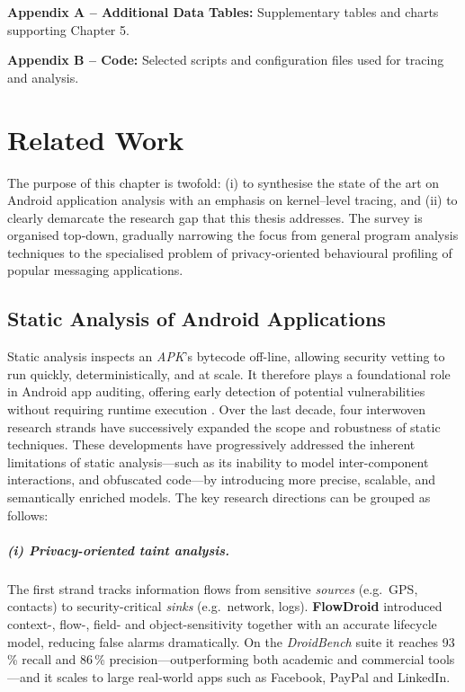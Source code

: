 \documentclass[a4paper,12pt]{report}
\begin{document}
\vspace{0.4em}
\textbf{Appendix A – Additional Data Tables:} Supplementary tables and charts supporting Chapter 5.

\vspace{0.4em}
\textbf{Appendix B – Code:} Selected scripts and configuration files used for tracing and analysis.



\chapter{Related Work}\label{ch:related}

The purpose of this chapter is twofold: (i) to synthesise the state of the art on Android
application analysis with an emphasis on kernel–level tracing, and (ii) to
clearly demarcate the research gap that this thesis addresses.  The survey is
organised top‑down, gradually narrowing the focus from general program analysis
techniques to the specialised problem of privacy‑oriented behavioural
profiling of popular messaging applications.

\section{Static Analysis of Android Applications}
\label{sec:rw:static}

Static analysis inspects an \emph{APK}'s bytecode off-line, allowing security vetting to run quickly, deterministically, and at scale. It therefore plays a foundational role in Android app auditing, offering early detection of potential vulnerabilities without requiring runtime execution \cite{arzt2014flowdroid}.  Over the last decade, four interwoven research strands have successively expanded the scope and robustness of static techniques. These developments have progressively addressed the inherent limitations of static analysis—such as its inability to model inter-component interactions, and obfuscated code—by introducing more precise, scalable, and semantically enriched models. The key research directions can be grouped as follows:

\paragraph{(i) Privacy-oriented taint analysis.}
The first strand tracks information flows from sensitive \emph{sources} (e.g.\ GPS, contacts) to security-critical \emph{sinks} (e.g.\ network, logs).  \textbf{FlowDroid} introduced context-, flow-, field- and object-sensitivity together with an accurate lifecycle model, reducing false alarms dramatically.  On the \emph{DroidBench} suite it reaches 93\,\% recall and 86\,\% precision—outperforming both academic and commercial tools \cite{arzt2014flowdroid}—and it scales to large real-world apps such as Facebook, PayPal and LinkedIn.
\end{document}
